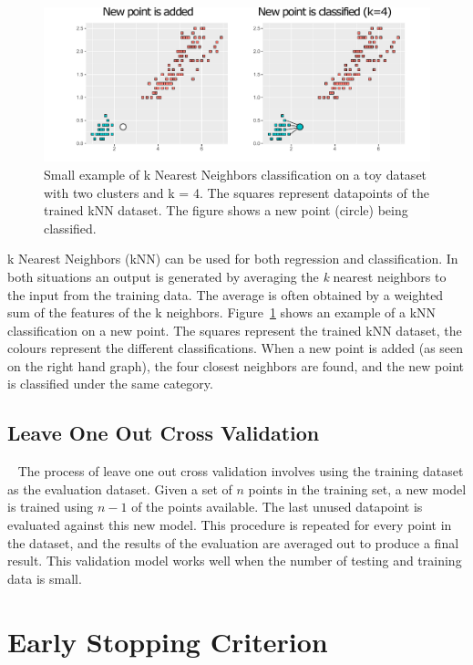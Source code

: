 \begin{figure}[t]
    \centering
    \includegraphics[width=1\textwidth]{background/graphics/knn1.pdf}
    \caption{Small example of k Nearest Neighbors classification on a toy dataset with two clusters and k = 4. The squares represent datapoints of the trained kNN dataset. The figure shows a new point (circle) being classified.}
    \label{fig:knn}
\end{figure}
k Nearest Neighbors (kNN) can be used for both regression and classification.
In both situations an output is generated by averaging the \textit{k} nearest neighbors to the input from the training data.
The average is often obtained by a weighted sum of the features of the k neighbors.
Figure~\ref{fig:knn} shows an example of a kNN classification on a new point.
The squares represent the trained kNN dataset, the colours represent the different classifications.
When a new point is added (as seen on the right hand graph), the four closest neighbors are found, and the new point is classified under the same category.

\subsection{Leave One Out Cross Validation}~\label{sec:valid}
The process of leave one out cross validation involves using the training dataset as the evaluation dataset.
Given a set of $n$ points in the training set, a new model is trained using $n-1$ of the points available.
The last unused datapoint is evaluated against this new model.
This procedure is repeated for every point in the dataset, and the results of the evaluation are averaged out to produce a final result.
This validation model works well when the number of testing and training data is small.

\section{Early Stopping Criterion}~\label{sec:esc}

